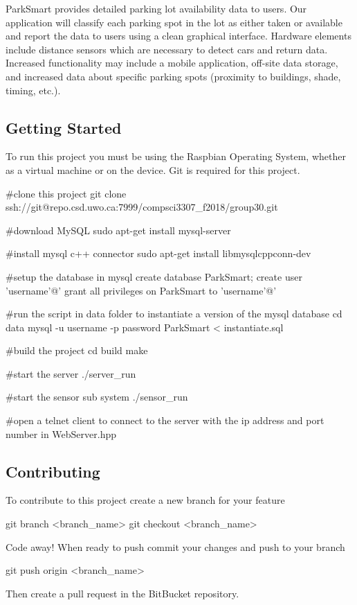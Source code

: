 Park\+Smart provides detailed parking lot availability data to users. Our application will classify each parking spot in the lot as either taken or available and report the data to users using a clean graphical interface. Hardware elements include distance sensors which are necessary to detect cars and return data. Increased functionality may include a mobile application, off-\/site data storage, and increased data about specific parking spots (proximity to buildings, shade, timing, etc.).

\subsection*{Getting Started}

To run this project you must be using the Raspbian Operating System, whether as a virtual machine or on the device. Git is required for this project. 
\begin{DoxyCode}
#clone this project
git clone ssh://git@repo.csd.uwo.ca:7999/compsci3307\_f2018/group30.git

#download MySQL
sudo apt-get install mysql-server

#install mysql c++ connector
sudo apt-get install libmysqlcppconn-dev

#setup the database in mysql
create database ParkSmart;
create user 'username'@'%
grant all privileges on ParkSmart to 'username'@'%

#run the script in data folder to instantiate a version of the mysql database
cd data
mysql -u username -p password ParkSmart < instantiate.sql

#build the project
cd build
make

#start the server
./server\_run

#start the sensor sub system
./sensor\_run

#open a telnet client to connect to the server with the ip address and port number in WebServer.hpp
\end{DoxyCode}


\subsection*{Contributing}

To contribute to this project create a new branch for your feature 
\begin{DoxyCode}
git branch <branch\_name>
git checkout <branch\_name>
\end{DoxyCode}
 Code away! When ready to push commit your changes and push to your branch 
\begin{DoxyCode}
git push origin <branch\_name>
\end{DoxyCode}
 Then create a pull request in the Bit\+Bucket repository.

